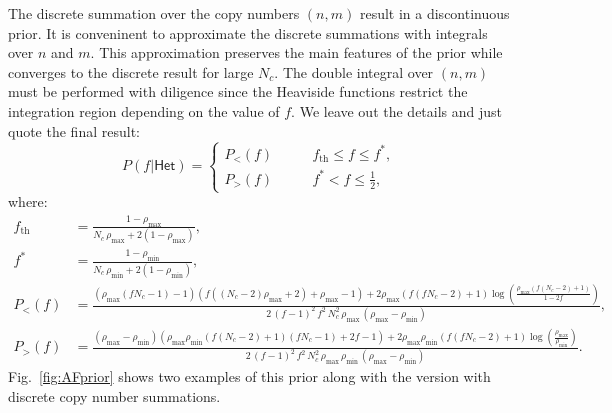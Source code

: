 \documentclass[nofootinbib,amssymb,amsmath]{revtex4}
\begin{document}
The discrete summation over the copy numbers $(n,m)$ result in a discontinuous prior. It is conveninent to approximate the discrete summations with integrals over $n$ and $m$. This approximation preserves the main features of the prior while converges to the discrete result for large $N_c$. The double integral over $(n,m)$ must be performed with diligence since the Heaviside functions restrict the integration region depending on the value of $f$. We leave out the details and just quote the final result:
\begin{equation}\label{eq:AFpriorcont}
P(f|\mathsf{Het}) = \left\{\begin{array}{ll}
	P_<(f) & \qquad f_\mathrm{th} \leq f \leq f^*,\\
	P_>(f) & \qquad f^* < f \leq \frac{1}{2},
\end{array}
\right.
\end{equation}
where:
\begin{align}
f_\mathrm{th} &= \frac{1 - \rho_\mathrm{max}}{N_c \, \rho_\mathrm{max} + 2(1-\rho_\mathrm{max})},\nonumber\\
f^* &= \frac{1 - \rho_\mathrm{min}}{N_c \, \rho_\mathrm{min} + 2(1-\rho_\mathrm{min})},\nonumber\\
P_<(f) &= \frac{(\rho_\mathrm{max} (f N_c-1)-1) (f ((N_c-2) \rho_\mathrm{max}+2)+\rho_\mathrm{max}-1)+2 \rho_\mathrm{max} (f (f N_c-2)+1) \log \left(\frac{\rho_\mathrm{max} (f (N_c-2)+1)}{1-2 f}\right)}{2 \, (f-1)^2 \, f^2 \, N_c^2 \, \rho_\mathrm{max} \, (\rho_\mathrm{max}-\rho_\mathrm{min})},\nonumber\\
P_>(f) &= \frac{(\rho_\mathrm{max}-\rho_\mathrm{min}) (\rho_\mathrm{max} \rho_\mathrm{min} (f (N_c-2)+1) (f N_c-1)+2 f-1)+2 \rho_\mathrm{max} \rho_\mathrm{min} (f (f N_c-2)+1) \log \left(\frac{\rho_\mathrm{max}}{\rho_\mathrm{min}}\right)}{2 \, (f-1)^2 \, f^2 \, N_c^2 \, \rho_\mathrm{max} \, \rho_\mathrm{min} \, (\rho_\mathrm{max}-\rho_\mathrm{min})}.
\end{align}
Fig.~\ref{fig:AFprior} shows two examples of this prior along with the version with discrete copy number summations.\\
\end{document}
